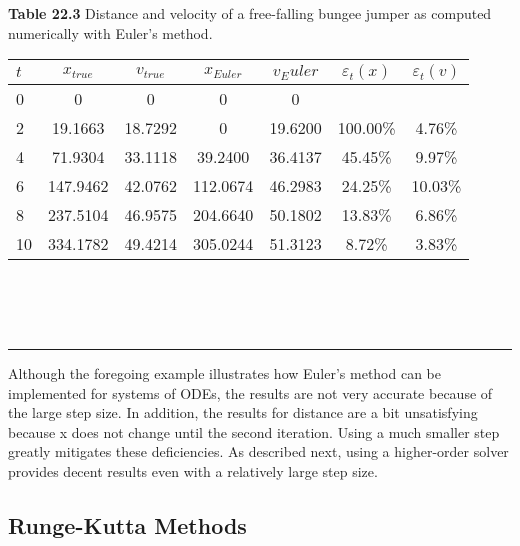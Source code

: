 \documentclass[../main.tex]{subfiles}
\begin{document}
\textbf{Table 22.3} Distance and velocity of a free-falling bungee jumper as computed
numerically with Euler's method.\\

\begin{tabular}{lcccccc}
\hline

	\textbf{$t$} \; \; \; \; \; & \textbf{$x_{true}$} \; \; \; \; \; & \textbf{$v_{true}$} \; \; \; \; \; & \textbf{$x_{Euler}$} \; \; \; \; \; & \textbf{$v_Euler$} \; \; \; \; \; & \textbf{$\varepsilon_{t}(x)$} \; \; \; \; \; & \textbf{$\varepsilon_{t}(v)$}\\
	
\hline

	0 & 0 & 0 & 0 & 0 & \vspace{0in} & \vspace{0in}\\
	
	2 & 19.1663 & 18.7292 & 0 & 19.6200 & 100.00\% & 4.76\%\\
	
	4 & 71.9304 & 33.1118 & 39.2400 & 36.4137 & 45.45\% & 9.97\%\\
	
	6 & 147.9462 & 42.0762 & 112.0674 & 46.2983 & 24.25\% & 10.03\%\\
	
	8 & 237.5104 & 46.9575 & 204.6640 & 50.1802 & 13.83\% & 6.86\%\\
	
	10 & 334.1782 & 49.4214 & 305.0244 & 51.3123 & 8.72\% & 3.83\%\\

\hline
\end{tabular}\\
\\
\\
\hrule
\vspace{0.2in}
Although the foregoing example illustrates how Euler's method can be implemented for
systems of ODEs, the results are not very accurate because of the large step size. In addition,
the results for distance are a bit unsatisfying because x does not change until the second
iteration. Using a much smaller step greatly mitigates these deficiencies. As described next,
using a higher-order solver provides decent results even with a relatively large step size.

\subsection{Runge-Kutta Methods}
\end{document}
